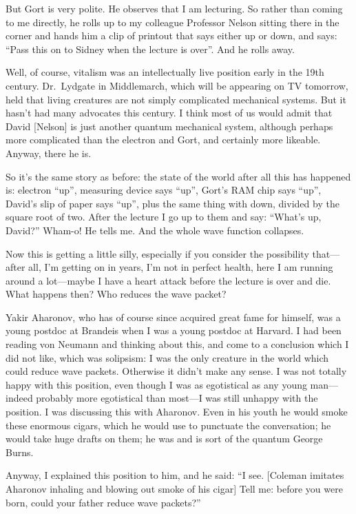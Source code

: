 \documentclass[twocolumn,prb]{revtex4}
\begin{document}
But Gort is very polite. He observes that I am lecturing. So rather than coming to me directly, he rolls up to my colleague Professor Nelson sitting there in the corner and hands him a clip of printout that says either up or down, and says: ``Pass this on to Sidney when the lecture is over''. And he rolls away.

Well, of course, vitalism was an intellectually live position early in the 19th century. Dr.\ Lydgate in Middlemarch, which will be appearing on TV tomorrow, held that living creatures are not simply complicated mechanical systems. But it hasn't had many advocates this century. I think most of us would admit that David [Nelson] is just another quantum mechanical system, although perhaps more complicated than the electron and Gort, and certainly more likeable. Anyway, there he is.

So it's the same story as before: the state of the world after all this has happened is: electron ``up'', measuring device says ``up'', Gort's RAM chip says ``up'', David's slip of paper says ``up'', plus the same thing with down, divided by the square root of two. After the lecture I go up to them and say: ``What's up, David?'' Wham-o! He tells me. And the whole wave function collapses.

Now this is getting a little silly, especially if you consider the possibility that---after all, I'm getting on in years, I'm not in perfect health, here I am running around a lot---maybe I have a heart attack before the lecture is over and die. What happens then? Who reduces the wave packet?

Yakir Aharonov, who has of course since acquired great fame for himself, was a young postdoc at Brandeis when I was a young postdoc at Harvard. I had been reading von Neumann and thinking about this, and come to a conclusion which I did not like, which was solipsism: I was the only creature in the world which could reduce wave packets. Otherwise it didn't make any sense. I was not totally happy with this position, even though I was as egotistical as any young man---indeed probably more egotistical than most---I was still unhappy with the position. I was discussing this with Aharonov. Even in his youth he would smoke these enormous cigars, which he would use to punctuate the conversation; he would take huge drafts on them; he was and is sort of the quantum George Burns.

Anyway, I explained this position to him, and he said: ``I see. [Coleman imitates Aharonov inhaling and blowing out smoke of his cigar] Tell me: before you were born, could your father reduce wave packets?''
\end{document}
